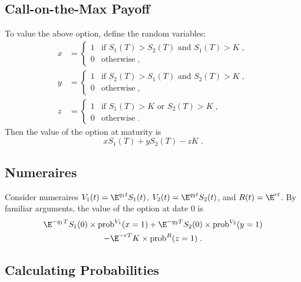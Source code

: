\subsection*{Call-on-the-Max Payoff}
To value the above option, define the random variables:
\begin{align*}
x&= \begin{cases} 1 & \text{if $S_1(T)>S_2(T)$ and $S_1(T)>K$}\; ,\\
0 & \text{otherwise}\;, \end{cases}\\
y&= \begin{cases} 1 & \text{if $S_2(T)> S_1(T)$ and $S_2(T)>K$}\; ,\\
0 & \text{otherwise}\;, \end{cases}\\
z&= \begin{cases} 1 & \text{if $S_1(T) > K$ or $S_2(T)> K$}\; ,\\
0 & \text{otherwise}\;. \end{cases}
\end{align*}
Then the value of the option at maturity is
$$xS_1(T) + yS_2(T) - zK\; .$$

\subsection*{Numeraires}
Consider numeraires  $V_1(t) = \E^{q_1t}S_1(t)$,  $V_2(t)=\E^{q_2t}S_2(t)$, and $R(t)=\E^{rt}$.
By familiar arguments, the value of the option at date 0 is
\begin{multline*}
\E^{-q_1T}S_1(0)\times\text{prob}^{V_1}(x=1) + \E^{-q_2T}S_2(0)\times\text{prob}^{V_2}(y=1) \\- \E^{-rT}K\times\text{prob}^R(z=1)\; .
\end{multline*}

\subsection*{Calculating Probabilities}

